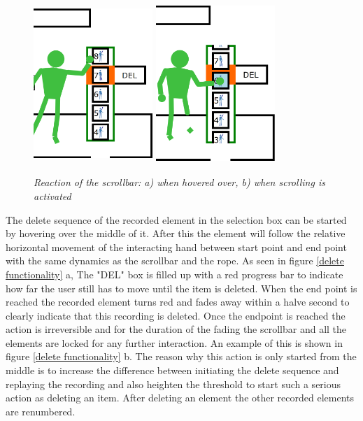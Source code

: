 \begin{figure}[H]
	\begin{center}
		\includegraphics[width=4.5cm, height=6cm]{figures/9_hover_scrollbar.png}
		\includegraphics[width=4.5cm, height=6cm]{figures/10_scroll_scrollbar.png}
		\caption{\emph{Reaction of the scrollbar: a) when hovered over, b) when scrolling is activated}}
		\label{scroll functionality}
	\end{center}
\end{figure}

The delete sequence of the recorded element in the selection box can be started by hovering over the middle of it. After this the element will follow the relative horizontal movement of the interacting hand between start point and end point with the same dynamics as the scrollbar and the rope. As seen in figure \ref{delete functionality} a, The "DEL" box is filled up with a red progress bar to indicate how far the user still has to move until the item is deleted. When the end point is reached the recorded element turns red and fades away within a halve second to clearly indicate that this recording is deleted. Once the endpoint is reached the action is irreversible and for the duration of the fading the scrollbar and all the elements are locked for any further interaction. An example of this is shown in figure \ref{delete functionality} b. The reason why this action is only started from the middle is to increase the difference between initiating the delete sequence and replaying the recording and also heighten the threshold to start such a serious action as deleting an item. After deleting an element the other recorded elements are renumbered.\\

